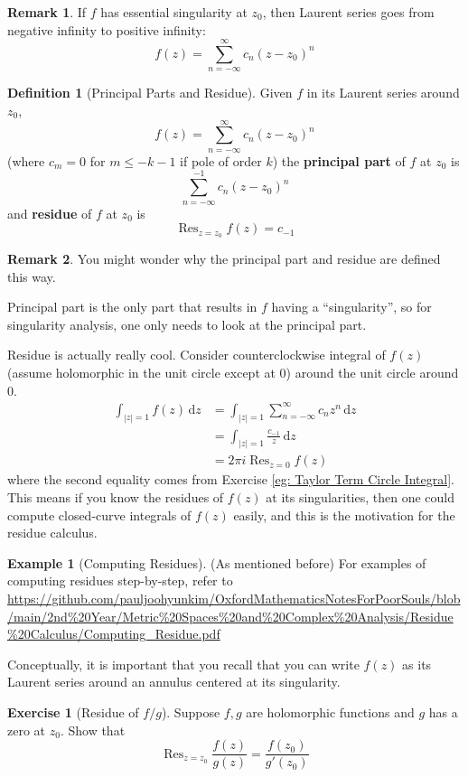 \documentclass[a4paper, 12pt]{article}
\theoremstyle{definition}
\newtheorem{definition}{Definition}
\newtheorem{exercise}{Exercise}
\newtheorem{example}{Example}
\newtheorem{remark}{Remark}
\numberwithin{theorem}{section}
\numberwithin{definition}{section}
\numberwithin{exercise}{section}
\numberwithin{remark}{section}
\numberwithin{figure}{section}
\numberwithin{example}{section}
\newcommand{\intd}{\,\text{d}}
\DeclareMathOperator{\res}{Res}
\begin{document}
\begin{remark}
    If $f$ has essential singularity at $z_0$, then Laurent series goes from negative infinity to positive infinity:
    \begin{equation*}
        f(z) = \sum_{n = -\infty}^{\infty} c_n (z-z_0)^n
    \end{equation*}
\end{remark}
\begin{definition}[Principal Parts and Residue]
    Given $f$ in its Laurent series around $z_0$,
    \begin{equation*}
        f(z) = \sum_{n = -\infty}^{\infty} c_n (z-z_0)^n
    \end{equation*}
    (where $c_m = 0$ for $m \leq -k-1$ if pole of order $k$)
    the \textbf{principal part} of $f$ at $z_0$ is
    \begin{equation*}
        \sum_{n = -\infty}^{-1} c_n \left( z-z_0 \right)^n
    \end{equation*}
    and \textbf{residue} of $f$ at $z_0$ is
    \begin{equation*}
        \res_{z=z_0} f(z) = c_{-1}
    \end{equation*}
\end{definition}
\begin{remark}
    You might wonder why the principal part and residue are defined this way.

    Principal part is the only part that results in $f$ having a ``singularity'',
    so for singularity analysis, one only needs to look at the principal part.

    Residue is actually really cool.
    Consider counterclockwise integral of $f(z)$ (assume holomorphic in the unit circle except at 0) around the unit circle around $0$.
    \begin{align*}
        \int_{|z| = 1} f(z) \intd z &= \int_{|z| = 1} \sum_{n=-\infty}^{\infty} c_n z^n \intd z\\
        &= \int_{|z| = 1} \frac{c_{-1}}{z} \intd z \\
        &= 2 \pi i \res_{z=0} f(z)
    \end{align*}
    where the second equality comes from Exercise \ref{eg: Taylor Term Circle Integral}.
    This means if you know the residues of $f(z)$ at its singularities,
    then one could compute closed-curve integrals of $f(z)$ easily,
    and this is the motivation for the residue calculus.
\end{remark}
\begin{example}[Computing Residues]
    (As mentioned before)
    For examples of computing residues step-by-step, refer to \url{https://github.com/pauljoohyunkim/OxfordMathematicsNotesForPoorSouls/blob/main/2nd\%20Year/Metric\%20Spaces\%20and\%20Complex\%20Analysis/Residue\%20Calculus/Computing\_Residue.pdf}

    Conceptually, it is important that you recall that you can write $f(z)$ as its
    Laurent series around an annulus centered at its singularity.
\end{example}
\begin{exercise}[Residue of $f / g$]
    Suppose $f,g$ are holomorphic functions and $g$ has a zero at $z_0$.
    Show that
    \begin{equation*}
        \res_{z=z_0} \frac{f(z)}{g(z)} = \frac{f(z_0)}{g'(z_0)}
    \end{equation*}
\end{exercise}
\end{document}
